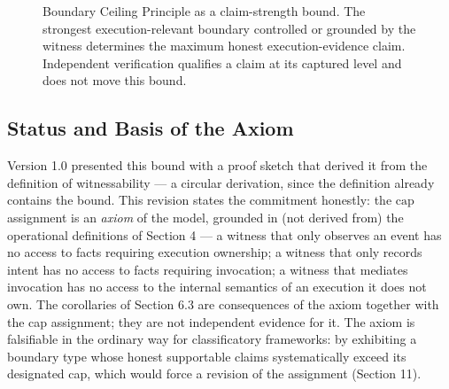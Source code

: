 \documentclass[11pt]{article}
\begin{document}
\begin{figure}[t]
\centering
{}
\caption{Boundary Ceiling Principle as a claim-strength bound. The strongest execution-relevant boundary controlled or grounded by the witness determines the maximum honest execution-evidence claim. Independent verification qualifies a claim at its captured level and does not move this bound.}
\label{fig:boundary-ceiling-principle}
\end{figure}

\subsection{Status and Basis of the Axiom}
Version 1.0 presented this bound with a proof sketch that derived it from the definition of witnessability --- a circular derivation, since the definition already contains the bound. This revision states the commitment honestly: the $\mathrm{cap}$ assignment is an \emph{axiom} of the model, grounded in (not derived from) the operational definitions of Section 4 --- a witness that only observes an event has no access to facts requiring execution ownership; a witness that only records intent has no access to facts requiring invocation; a witness that mediates invocation has no access to the internal semantics of an execution it does not own. The corollaries of Section 6.3 are consequences of the axiom together with the cap assignment; they are not independent evidence for it. The axiom is falsifiable in the ordinary way for classificatory frameworks: by exhibiting a boundary type whose honest supportable claims systematically exceed its designated cap, which would force a revision of the assignment (Section 11).
\end{document}

